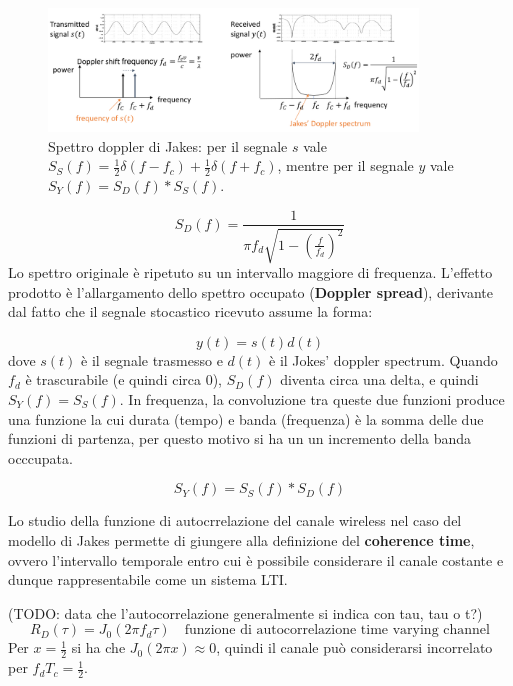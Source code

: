 \begin{figure}[ht]
    \centering
    \includegraphics[width=0.875\textwidth]{imgs/jakes.jpg}
    \captionsetup{width=.5\textwidth}
    \caption*{Spettro doppler di Jakes:
        per il segnale $s$ vale \( S_S(f) = \frac{1}{2} \delta \left(f - f_c \right) + \frac{1}{2} \delta \left(f + f_c\right) \),
        mentre per il segnale $y$ vale \( S_Y(f) = S_D(f) \ast S_S(f) \).
    }
\end{figure}

\[
    S_D(f) = \frac{1}{\pi f_d \sqrt{1 - \left(\frac{f}{f_d}\right)^2}}
\]
Lo spettro originale è ripetuto su un intervallo maggiore di frequenza. L'effetto prodotto è l'allargamento dello spettro occupato (\textbf{Doppler spread}), derivante dal fatto che il segnale stocastico ricevuto assume la forma:

\[
    y(t) = s(t) d(t)
\]
dove $s(t)$ è il segnale trasmesso e $d(t)$ è il Jokes' doppler spectrum. Quando $f_d$ è trascurabile (e quindi circa 0), $S_D(f)$ diventa circa una delta, e quindi $S_Y(f) = S_S(f)$. In frequenza, la convoluzione tra queste due funzioni produce una funzione la cui durata (tempo) e banda (frequenza) è la somma delle due funzioni di partenza, per questo motivo si ha un un incremento della banda occcupata.

\[
    S_Y(f) = S_S(f) \ast S_D(f)
\]

Lo studio della funzione di autocrrelazione del canale wireless nel caso del modello di Jakes permette di giungere alla definizione del \textbf{coherence time}, ovvero l'intervallo temporale entro cui è possibile considerare il canale costante e dunque rappresentabile come un sistema LTI.


(TODO:  data che l'autocorrelazione generalmente si indica con tau, tau o t?)
\[
    R_D (\tau) = J_0(2\pi f_d \tau) \quad \text{funzione di autocorrelazione time varying channel}
\]
Per $x=\frac{1}{2}$ si ha che $J_0(2\pi x) \approx 0$, quindi il canale può considerarsi incorrelato per $f_d T_c = \frac{1}{2}$.

